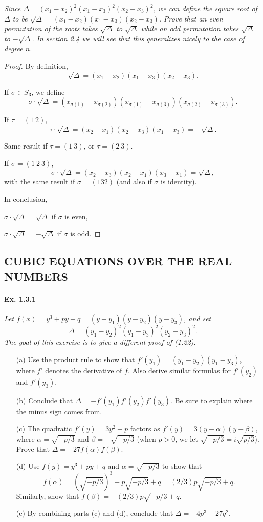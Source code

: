 \documentclass[11pt,a4paper]{article}
\begin{document}
{\it Since $\Delta = (x_1-x_2)^2(x_1-x_3)^2(x_2-x_3)^2$, we can define the square root of $\Delta$ to be $\sqrt{\Delta} = (x_1-x_2)(x_1-x_3)(x_2-x_3)$. Prove that an even permutation of the roots takes $\sqrt{\Delta}$ to $\sqrt{\Delta}$ while an odd permutation takes $\sqrt{\Delta}$ to $-\sqrt{\Delta}$. In section 2.4 we will see that this generalizes nicely to the case of degree $n$.
}

\begin{proof}
By definition,
$$\sqrt{\Delta} = (x_1-x_2)(x_1-x_3)(x_2-x_3).$$

If $\sigma \in S_3$, we define $$\sigma \cdot \sqrt{\Delta}  = (x_{\sigma(1)}-x_{\sigma(2)})(x_{\sigma(1)}-x_{\sigma(3)})(x_{\sigma(2)}-x_{\sigma(3)}).$$

If $\tau = (1\ 2)$, 
 $$\tau \cdot \sqrt{\Delta}  = (x_2-x_1)(x_2-x_3)(x_1-x_3) = -\sqrt{\Delta}.$$
 
Same result if $\tau = (1\ 3)$, or $\tau = (2\ 3)$.

If $\sigma = (1\  2\  3)$,
$$\sigma \cdot \sqrt{\Delta}  = (x_2-x_3)(x_2-x_1)(x_3-x_1) = \sqrt{\Delta},$$
with the  same result if $\sigma = (1 3 2)$ (and also if $\sigma$ is identity).

In conclusion, 

$\sigma \cdot \sqrt{\Delta}  = \sqrt{\Delta} $ if $\sigma$ is even,

$\sigma \cdot \sqrt{\Delta}  =- \sqrt{\Delta} $ if $\sigma$ is odd.
\end{proof}

\subsection{CUBIC EQUATIONS OVER THE REAL NUMBERS}

\paragraph{Ex. 1.3.1}

{\it Let $f(x) =y^3+py+q = (y-y_1)(y-y_2)(y-y_3)$, and set
$$\Delta = (y_1-y_2)^2(y_1-y_3)^2(y_2-y_3)^2.$$
The goal of this exercise is to give a different proof of (1.22).
\begin{enumerate}
\item[(a)] Use the product rule to show that $f'(y_1) = (y_1-y_2)(y_1-y_3)$, where $f'$ denotes the derivative of $f$. Also derive similar formulas for $f'(y_2)$ and $f'(y_3)$.
\item[(b)] Conclude that $\Delta = -f'(y_1)f'(y_2)f'(y_3)$. Be sure to explain where the minus sign comes from.
\item[(c)] The quadratic $f'(y) = 3y^2+p$ factors as $f'(y) = 3(y-\alpha)(y-\beta)$, where $\alpha = \sqrt{-p/3}$ and $\beta = - \sqrt{-p/3}$ (when $p>0$, we let $\sqrt{-p/3} = i\sqrt{p/3}$). Prove that $\Delta = -27 f(\alpha)f(\beta)$.
\item[(d)] Use $f(y) = y^3 + py +q$ and $\alpha = \sqrt{-p/3}$ to show that
$$f(\alpha) = (\sqrt{-p/3})^3 + p\sqrt{-p/3} + q = (2/3)p\sqrt{-p/3} + q.$$
Similarly, show that $f(\beta) = -(2/3) p \sqrt{-p/3}+q$.
\item[(e)] By combining parts (c) and (d), conclude that $\Delta = -4p^3-27q^2$.
\end{enumerate}
}
\end{document}
